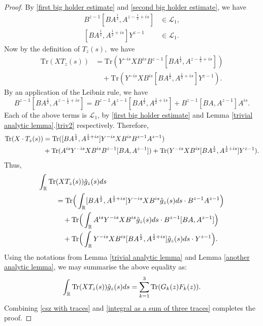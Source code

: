 \begin{proof}
        By \eqref{first big holder estimate} and \eqref{second big holder estimate}, we have
        \begin{align*}
             B^{z-1}[BA^{\frac{1}{2}},A^{z-\frac{1}{2}+is}] &\in \mathcal{L}_1,\\
              [BA^{\frac{1}{2}},A^{\frac{1}{2}+is}]Y^{z-1} &\in \mathcal{L}_1. 
        \end{align*}
        Now by the definition of $T_z(s),$ we have
        \begin{align*}
            \mathrm{Tr}(XT_z(s)) &= \mathrm{Tr}(Y^{-is}XB^{is}B^{z-1}[BA^{\frac12},A^{z-\frac12+is}])\\
                                 &\quad+ \mathrm{Tr}(Y^{-is}XB^{is}[BA^{\frac12},A^{\frac12+is}]Y^{z-1}).
        \end{align*}
        By an application of the Leibniz rule, we have
        $$B^{z-1}[BA^{\frac12},A^{z-\frac12+is}] = B^{z-1}A^{z-1}[BA^{\frac12},A^{\frac12+is}]+B^{z-1}[BA,A^{z-1}] A^{is}.$$
        Each of the above terms is $\mathcal{L}_1$, by \eqref{first big holder estimate} and Lemma \ref{trivial analytic lemma}.\eqref{triv2} respectively.
        Therefore,
        \begin{align*}
            {\rm Tr}(X\cdot T_z(s)) &= {\rm Tr}([BA^{\frac12},A^{\frac12+is}]Y^{-is}XB^{is} B^{z-1}A^{z-1})\\
                                    &+ {\rm Tr}(A^{is}Y^{-is}XB^{is} B^{z-1}[BA,A^{z-1}])+{\rm Tr}(Y^{-is}XB^{is}[BA^{\frac12},A^{\frac12+is}]Y^{z-1}).
        \end{align*}
        Thus,
        \begin{align*}
            \int_{\mathbb{R}}{\rm Tr}&(XT_z(s))\hat{g}_z(s)ds\\
                                     &={\rm Tr}\Big(\int_{\mathbb{R}}[BA^{\frac12},A^{\frac12+is}]Y^{-is}XB^{is}\hat{g}_z(s)ds\cdot B^{z-1}A^{z-1}\Big)\\
                                     &\quad +{\rm Tr}\Big(\int_{\mathbb{R}}A^{is}Y^{-is}XB^{is}\hat{g}_z(s)ds\cdot B^{z-1}[BA,A^{z-1}]\Big)\\
                                     &\quad +{\rm Tr}\Big(\int_{\mathbb{R}}Y^{-is}XB^{is}[BA^{\frac12},A^{\frac12+is}]\hat{g}_z(s)ds\cdot Y^{z-1}\Big).
        \end{align*}
        Using the notations from Lemma \ref{trivial analytic lemma} and Lemma \ref{another analytic lemma}, we may summarise the above equality as:
        \begin{equation}\label{integral as a sum of three traces}
            \int_{\mathbb{R}}{\rm Tr}(XT_z(s))\hat{g}_z(s)ds=\sum_{k=1}^3{\rm Tr}(G_k(z)F_k(z)).
        \end{equation}
        Combining \eqref{csz with traces} and \eqref{integral as a sum of three traces} completes the proof.
    \end{proof}
    
